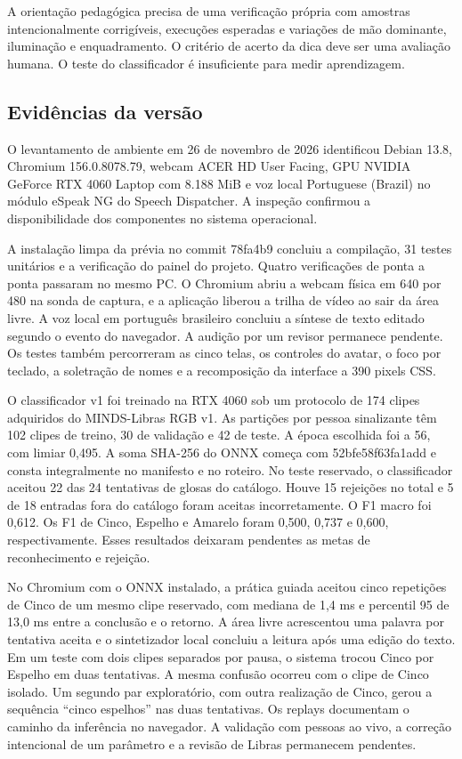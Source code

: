 \documentclass[12pt,a4paper]{article}
\begin{document}
A orientação pedagógica precisa de uma verificação própria com amostras intencionalmente corrigíveis, execuções esperadas e variações de mão dominante, iluminação e enquadramento. O critério de acerto da dica deve ser uma avaliação humana. O teste do classificador é insuficiente para medir aprendizagem.

\subsection{Evidências da versão}

O levantamento de ambiente em 26 de novembro de 2026 identificou Debian 13.8, Chromium 156.0.8078.79, webcam ACER HD User Facing, GPU NVIDIA GeForce RTX 4060 Laptop com 8.188 MiB e voz local Portuguese (Brazil) no módulo eSpeak NG do Speech Dispatcher. A inspeção confirmou a disponibilidade dos componentes no sistema operacional.

A instalação limpa da prévia no commit 78fa4b9 concluiu a compilação, 31 testes unitários e a verificação do painel do projeto. Quatro verificações de ponta a ponta passaram no mesmo PC. O Chromium abriu a webcam física em 640 por 480 na sonda de captura, e a aplicação liberou a trilha de vídeo ao sair da área livre. A voz local em português brasileiro concluiu a síntese de texto editado segundo o evento do navegador. A audição por um revisor permanece pendente. Os testes também percorreram as cinco telas, os controles do avatar, o foco por teclado, a soletração de nomes e a recomposição da interface a 390 pixels CSS.

O classificador v1 foi treinado na RTX 4060 sob um protocolo de 174 clipes adquiridos do MINDS-Libras RGB v1. As partições por pessoa sinalizante têm 102 clipes de treino, 30 de validação e 42 de teste. A época escolhida foi a 56, com limiar 0,495. A soma SHA-256 do ONNX começa com 52bfe58f63fa1add e consta integralmente no manifesto e no roteiro. No teste reservado, o classificador aceitou 22 das 24 tentativas de glosas do catálogo. Houve 15 rejeições no total e 5 de 18 entradas fora do catálogo foram aceitas incorretamente. O F1 macro foi 0,612. Os F1 de Cinco, Espelho e Amarelo foram 0,500, 0,737 e 0,600, respectivamente. Esses resultados deixaram pendentes as metas de reconhecimento e rejeição.

No Chromium com o ONNX instalado, a prática guiada aceitou cinco repetições de Cinco de um mesmo clipe reservado, com mediana de 1,4 ms e percentil 95 de 13,0 ms entre a conclusão e o retorno. A área livre acrescentou uma palavra por tentativa aceita e o sintetizador local concluiu a leitura após uma edição do texto. Em um teste com dois clipes separados por pausa, o sistema trocou Cinco por Espelho em duas tentativas. A mesma confusão ocorreu com o clipe de Cinco isolado. Um segundo par exploratório, com outra realização de Cinco, gerou a sequência “cinco espelhos” nas duas tentativas. Os replays documentam o caminho da inferência no navegador. A validação com pessoas ao vivo, a correção intencional de um parâmetro e a revisão de Libras permanecem pendentes.
\end{document}
